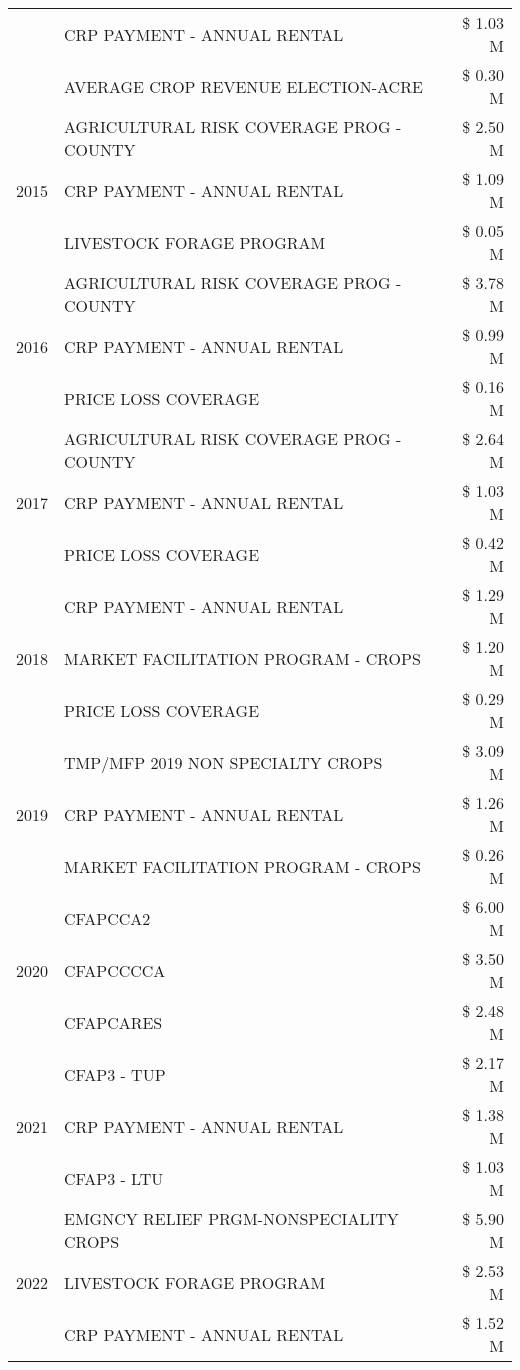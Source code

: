 \begin{tabular}{llr}
 & CRP PAYMENT - ANNUAL RENTAL & \$ 1.03 M \\
 & AVERAGE CROP REVENUE ELECTION-ACRE & \$ 0.30 M \\
\cline{1-3}
\multirow[t]{3}{*}{2015} & AGRICULTURAL RISK COVERAGE PROG - COUNTY & \$ 2.50 M \\
 & CRP PAYMENT - ANNUAL RENTAL & \$ 1.09 M \\
 & LIVESTOCK FORAGE PROGRAM & \$ 0.05 M \\
\cline{1-3}
\multirow[t]{3}{*}{2016} & AGRICULTURAL RISK COVERAGE PROG - COUNTY & \$ 3.78 M \\
 & CRP PAYMENT - ANNUAL RENTAL & \$ 0.99 M \\
 & PRICE LOSS COVERAGE & \$ 0.16 M \\
\cline{1-3}
\multirow[t]{3}{*}{2017} & AGRICULTURAL RISK COVERAGE PROG - COUNTY & \$ 2.64 M \\
 & CRP PAYMENT - ANNUAL RENTAL & \$ 1.03 M \\
 & PRICE LOSS COVERAGE & \$ 0.42 M \\
\cline{1-3}
\multirow[t]{3}{*}{2018} & CRP PAYMENT - ANNUAL RENTAL & \$ 1.29 M \\
 & MARKET FACILITATION PROGRAM - CROPS & \$ 1.20 M \\
 & PRICE LOSS COVERAGE & \$ 0.29 M \\
\cline{1-3}
\multirow[t]{3}{*}{2019} & TMP/MFP 2019 NON SPECIALTY CROPS & \$ 3.09 M \\
 & CRP PAYMENT - ANNUAL RENTAL & \$ 1.26 M \\
 & MARKET FACILITATION PROGRAM - CROPS & \$ 0.26 M \\
\cline{1-3}
\multirow[t]{3}{*}{2020} & CFAPCCA2 & \$ 6.00 M \\
 & CFAPCCCCA & \$ 3.50 M \\
 & CFAPCARES & \$ 2.48 M \\
\cline{1-3}
\multirow[t]{3}{*}{2021} & CFAP3 - TUP & \$ 2.17 M \\
 & CRP PAYMENT - ANNUAL RENTAL & \$ 1.38 M \\
 & CFAP3 - LTU & \$ 1.03 M \\
\cline{1-3}
\multirow[t]{3}{*}{2022} & EMGNCY RELIEF PRGM-NONSPECIALITY CROPS & \$ 5.90 M \\
 & LIVESTOCK FORAGE PROGRAM & \$ 2.53 M \\
 & CRP PAYMENT - ANNUAL RENTAL & \$ 1.52 M \\
\cline{1-3}
\bottomrule
\end{tabular}
